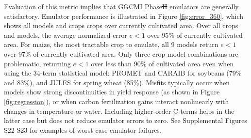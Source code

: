 \documentclass[gmdd]{copernicus} %
\providecommand{\DIFadd}[1]{{\protect\color{blue}\uwave{#1}}} %
\providecommand{\DIFdel}[1]{{\protect\color{red}\sout{#1}}}                      %
\providecommand{\DIFaddbegin}{} %
\providecommand{\DIFaddend}{} %
\providecommand{\DIFdelbegin}{} %
\providecommand{\DIFdelend}{} %
\begin{document}
\DIFaddend Evaluation of this metric implies that GGCMI Phase\DIFdelbegin \DIFdel{II }\DIFdelend \DIFaddbegin \DIFadd{~2 }\DIFaddend emulators are generally satisfactory. 
Emulator performance is illustrated in Figure \ref{fig:error_360}, which shows all models and crops crops over currently cultivated area.
Over all crops and models, the average normalized error $e < 1$ over 95\% of currently cultivated area.
For maize, the most tractable crop to emulate, all 9 models return $e < 1$ over 97\% of currently cultivated area. 
Only three crop-model combinations are problematic, returning $e < 1$ over less than 90\% of cultivated area even when using the 34-term statistical model: PROMET and CARAIB for soybeans (79\% and 83\%), and JULES for spring wheat (85\%).
Misfits typically occur when models show strong discontinuities in yield response (as shown in Figure \ref{fig:regression}), or when carbon \DIFaddbegin \DIFadd{dioxide }\DIFaddend fertilization gains interact nonlinearly with changes in temperature or water.
Including higher-order C terms helps in the latter case but does not reduce emulator errors to zero. 
See Supplemental Figures S22-S23 for examples of worst-case emulator failures.
\end{document}
